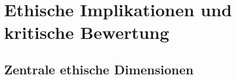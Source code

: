 \chapter{Ethische Implikationen und kritische Bewertung}
\label{chap:ethik}


\section{Zentrale ethische Dimensionen}
\label{sec:ethische_dimensionen}


\label{subsec:autonomie_ic}


\label{subsubsec:free_choice}

\label{subsubsec:koerzion_kompet}

